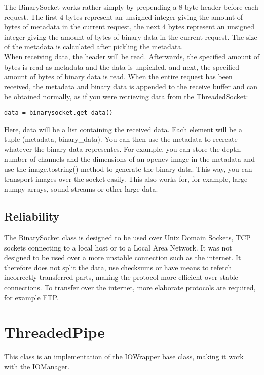 \documentclass[a4paper, 10pt, oneside]{article}
\begin{document}
The BinarySocket works rather simply by prepending a 8-byte header before each
request. The first 4 bytes represent an unsigned integer giving the amount of
bytes of metadata in the current request, the next 4 bytes represent an unsigned
integer giving the amount of bytes of binary data in the current request. The
size of the metadata is calculated after pickling the metadata.\\

When receiving data, the header will be read. Afterwards, the specified amount
of bytes is read as metadata and the data is unpickled, and next, the specified
amount of bytes of binary data is read. When the entire request has been
received, the metadata and binary data is appended to the receive buffer and can
be obtained normally, as if you were retrieving data from the ThreadedSocket:\\

\begin{lstlisting}
data = binarysocket.get_data()
\end{lstlisting}

Here, data will be a list containing the received data. Each element will be a
tuple (metadata, binary\_data). You can then use the metadata to recreate
whatever the binary data representes. For example, you can store the depth,
number of channels and the dimensions of an opencv image in the metadata and use
the image.tostring() method to generate the binary data. This way, you can
transport images over the socket easily. This also works for, for example, large
numpy arrays, sound streams or other large data.\\

\subsection{Reliability}
The BinarySocket class is designed to be used over Unix Domain Sockets, TCP
sockets connecting to a local host or to a Local Area Network. It was not
designed to be used over a more unstable connection such as the internet. It
therefore does not split the data, use checksums or have means to refetch
incorrectly transferred parts, making the protocol more efficient over stable
connections. To transfer over the internet, more elaborate protocols are
required, for example FTP. 

\section{ThreadedPipe}
This class is an implementation of the IOWrapper base class, making it work with
the IOManager.\\
\end{document}
